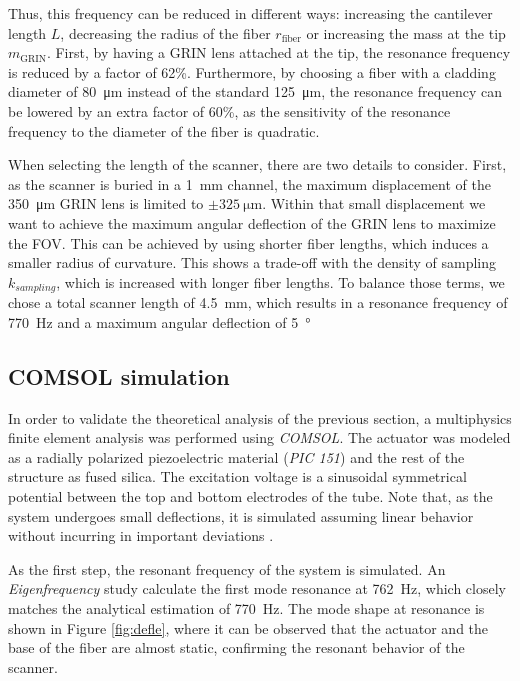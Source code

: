 \documentclass[10pt]{iopart}
\begin{document}
Thus, this frequency can be reduced in different ways: increasing the cantilever length $L$, decreasing the radius of the fiber $r_\mathrm{fiber}$ or increasing the mass at the tip $m_{\mathrm{GRIN}}$. First, by having a GRIN lens attached at the tip, the resonance frequency is reduced by a factor of 62\%. Furthermore, by choosing a fiber with a cladding diameter of \SI{80}{\micro\meter} instead of the standard \SI{125}{\micro\meter}, the resonance frequency can be lowered by an extra factor of 60\%, as the sensitivity of the resonance frequency to the diameter of the fiber is quadratic. 

When selecting the length of the scanner, there are two details to consider. First, as the scanner is buried in a \SI{1}{\milli\meter} channel, the maximum displacement of the \SI{350}{\micro\meter} GRIN lens is limited to $\pm\SI{325}{\micro\meter}$. Within that small displacement we want to achieve the maximum angular deflection of the GRIN lens to maximize the FOV. This can be achieved by using shorter fiber lengths, which induces a smaller radius of curvature. This shows a trade-off with the density of sampling $k_{sampling}$, which is increased with longer fiber lengths. To balance those terms, we chose a total scanner length of \SI{4.5}{\milli\meter}, which results in a resonance frequency of \SI{770}{\hertz} and a maximum angular deflection of \SI{5}{\degree}


\subsection{COMSOL simulation}

In order to validate the theoretical analysis of the previous section, a multiphysics finite element analysis was performed using \textit{COMSOL}. The actuator was modeled as a radially polarized piezoelectric material (\textit{PIC 151}) and the rest of the structure as fused silica. The excitation voltage is a sinusoidal symmetrical potential between the top and bottom electrodes of the tube. Note that, as the system undergoes small deflections, it is simulated assuming linear behavior without incurring in important deviations \cite{Fertis2006}.

As the first step, the resonant frequency of the system is simulated. An \textit{Eigenfrequency} study calculate the first mode resonance at \SI{762}{\hertz}, which closely matches the analytical estimation of \SI{770}{\hertz}. The mode shape at resonance is shown in Figure \ref{fig:defle}, where it can be observed that the actuator and the base of the fiber are almost static, confirming the resonant behavior of the scanner.
\end{document}
